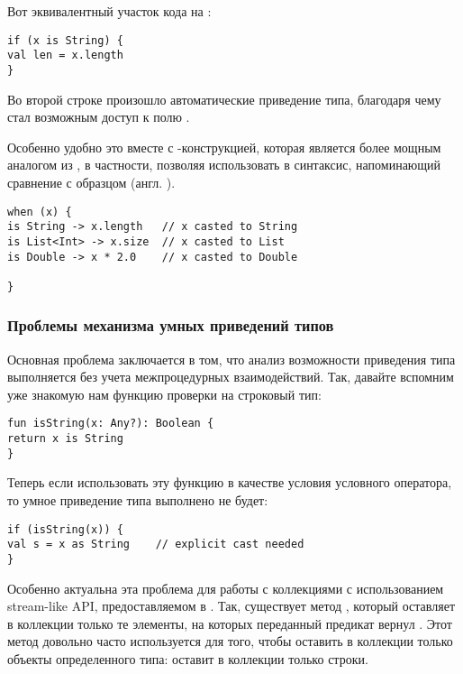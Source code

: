 Вот эквивалентный участок кода на : 

\begin{verbatim}
if (x is String) {
val len = x.length
}
\end{verbatim}

Во второй строке произошло автоматические приведение типа, благодаря чему стал возможным доступ к полю .

Особенно удобно это вместе с -конструкцией, которая является более мощным аналогом  из , в частности, позволяя использовать в  синтаксис, напоминающий сравнение с образцом (англ. ).

\begin{verbatim}
when (x) {
is String -> x.length   // x casted to String
is List<Int> -> x.size  // x casted to List
is Double -> x * 2.0    // x casted to Double

}
\end{verbatim}




\subsubsection{Проблемы механизма умных приведений типов}

Основная проблема заключается в том, что анализ возможности приведения типа выполняется без учета межпроцедурных взаимодействий. Так, давайте вспомним уже знакомую нам функцию проверки на строковый тип:

\begin{verbatim}
fun isString(x: Any?): Boolean {
return x is String
}
\end{verbatim}

Теперь если использовать эту функцию в качестве условия условного оператора, то умное приведение типа выполнено не будет:

\begin{verbatim}
if (isString(x)) {
val s = x as String    // explicit cast needed
}
\end{verbatim}

Особенно актуальна эта проблема для работы с коллекциями с использованием stream-like API, предоставляемом в . Так, существует метод , который оставляет в коллекции только те элементы, на которых переданный предикат вернул . Этот метод довольно часто используется для того, чтобы оставить в коллекции только объекты определенного типа:  оставит в коллекции  только строки.

